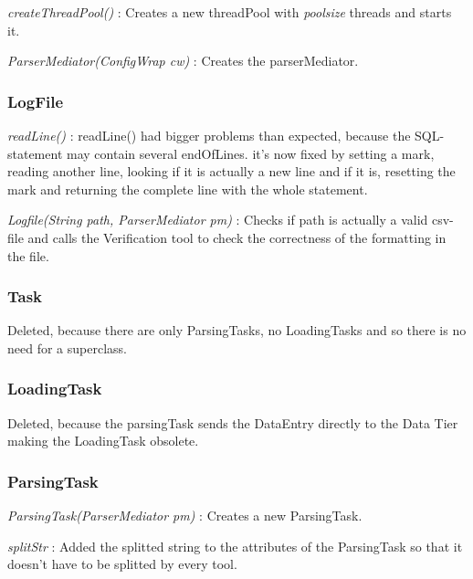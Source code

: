 \textit{createThreadPool()} : Creates a new threadPool with \textit{poolsize} threads and starts it. \newline\newline

\textit{ParserMediator(ConfigWrap cw)} : Creates the parserMediator.

\subsubsection{LogFile}

\textit{readLine()} : readLine() had bigger problems than expected, because the SQL-statement may contain several endOfLines. it's now 
fixed by setting a mark, reading another line, looking if it is actually a new line and if it is, resetting the mark and returning
the complete line with the whole statement. \newline\newline

\textit{Logfile(String path, ParserMediator pm)} : Checks if path is actually a valid csv-file and calls the Verification tool to check the
correctness of the formatting in the file.

\subsubsection{Task}

Deleted, because there are only ParsingTasks, no LoadingTasks and so there is no need for a superclass.

\subsubsection{LoadingTask}

Deleted, because the parsingTask sends the DataEntry directly to the Data Tier making the LoadingTask obsolete.

\subsubsection{ParsingTask}

\textit{ParsingTask(ParserMediator pm)} : Creates a new ParsingTask.\newline\newline

\textit{splitStr} : Added the splitted string to the attributes of the ParsingTask so that it doesn't have to be splitted by every tool.

